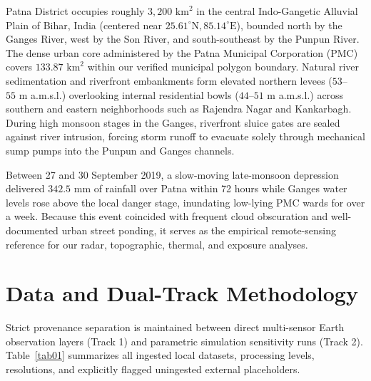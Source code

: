 \documentclass[OA,linenum]{InterPore}
\begin{document}
Patna District occupies roughly $3,200\text{ km}^2$ in the central Indo-Gangetic Alluvial Plain of Bihar, India (centered near $25.61^\circ\text{N}, 85.14^\circ\text{E}$), bounded north by the Ganges River, west by the Son River, and south-southeast by the Punpun River. The dense urban core administered by the Patna Municipal Corporation (PMC) covers $133.87\text{ km}^2$ within our verified municipal polygon boundary. Natural river sedimentation and riverfront embankments form elevated northern levees ($53$--$55\text{ m}$ a.m.s.l.) overlooking internal residential bowls ($44$--$51\text{ m}$ a.m.s.l.) across southern and eastern neighborhoods such as Rajendra Nagar and Kankarbagh. During high monsoon stages in the Ganges, riverfront sluice gates are sealed against river intrusion, forcing storm runoff to evacuate solely through mechanical sump pumps into the Punpun and Ganges channels.

Between 27 and 30 September 2019, a slow-moving late-monsoon depression delivered $342.5\text{ mm}$ of rainfall over Patna within 72 hours while Ganges water levels rose above the local danger stage, inundating low-lying PMC wards for over a week. Because this event coincided with frequent cloud obscuration and well-documented urban street ponding, it serves as the empirical remote-sensing reference for our radar, topographic, thermal, and exposure analyses.

\section{Data and Dual-Track Methodology}

Strict provenance separation is maintained between direct multi-sensor Earth observation layers (Track 1) and parametric simulation sensitivity runs (Track 2). Table~\ref{tab01} summarizes all ingested local datasets, processing levels, resolutions, and explicitly flagged uningested external placeholders.
\end{document}
